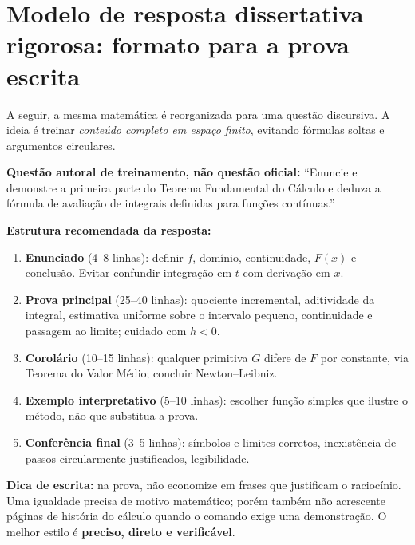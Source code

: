 \documentclass[11pt,a4paper]{article}
\begin{document}
\section{Modelo de resposta dissertativa rigorosa: formato para a prova escrita}
A seguir, a mesma matemática é reorganizada para uma questão discursiva. A ideia é treinar \emph{conteúdo completo em espaço finito}, evitando fórmulas soltas e argumentos circulares.

\begin{cuidado}
\textbf{Questão autoral de treinamento, não questão oficial:} ``Enuncie e demonstre a primeira parte do Teorema Fundamental do Cálculo e deduza a fórmula de avaliação de integrais definidas para funções contínuas.''
\end{cuidado}

\textbf{Estrutura recomendada da resposta:}
\begin{enumerate}
\item \textbf{Enunciado} (4--8 linhas): definir $f$, domínio, continuidade, $F(x)$ e conclusão. Evitar confundir integração em $t$ com derivação em $x$.
\item \textbf{Prova principal} (25--40 linhas): quociente incremental, aditividade da integral, estimativa uniforme sobre o intervalo pequeno, continuidade e passagem ao limite; cuidado com $h<0$.
\item \textbf{Corolário} (10--15 linhas): qualquer primitiva $G$ difere de $F$ por constante, via Teorema do Valor Médio; concluir Newton--Leibniz.
\item \textbf{Exemplo interpretativo} (5--10 linhas): escolher função simples que ilustre o método, não que substitua a prova.
\item \textbf{Conferência final} (3--5 linhas): símbolos e limites corretos, inexistência de passos circularmente justificados, legibilidade.
\end{enumerate}

\textbf{Dica de escrita:} na prova, não economize em frases que justificam o raciocínio. Uma igualdade precisa de motivo matemático; porém também não acrescente páginas de história do cálculo quando o comando exige uma demonstração. O melhor estilo é \textbf{preciso, direto e verificável}.
\end{document}
